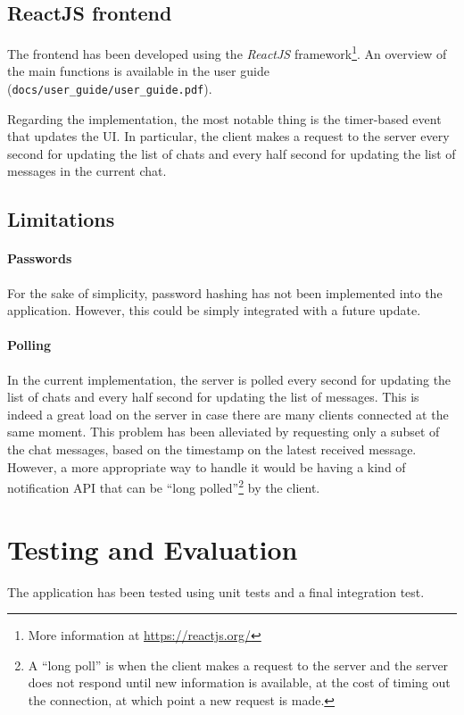 \documentclass[10pt]{article}
\begin{document}
\subsection{ReactJS frontend}
The frontend has been developed using the \emph{ReactJS} framework\footnote{More
information at \url{https://reactjs.org/}}. An overview of the main functions 
is available in the user guide (\texttt{docs/user\_guide/user\_guide.pdf}).

Regarding the implementation, the most notable thing is the timer-based event
that updates the UI. In particular, the client makes a request to the server
every second for updating the list of chats and every half second for updating 
the list of messages in the current chat.

\subsection{Limitations}
\paragraph{Passwords}
For the sake of simplicity, password hashing has not been implemented into the 
application. However, this could be simply integrated with a future update.

\paragraph{Polling}
In the current implementation, the server is polled every second for updating 
the list of chats and every half second for updating the list of messages. This 
is indeed a great load on the server in case there are many clients connected 
at the same moment. 
This problem has been alleviated by requesting only a subset of the chat 
messages, based on the timestamp on the latest received message.
However, 
a more appropriate way to handle it would be having a kind of notification API
that can be ``long polled''\footnote{A ``long poll'' is when the client 
makes a request to the server and the server does not respond until new 
information is available, at the cost of timing out the connection, at which 
point a new request is made.} by the client.

\clearpage
\section{Testing and Evaluation}
The application has been tested using unit tests and a final integration test.
\end{document}
